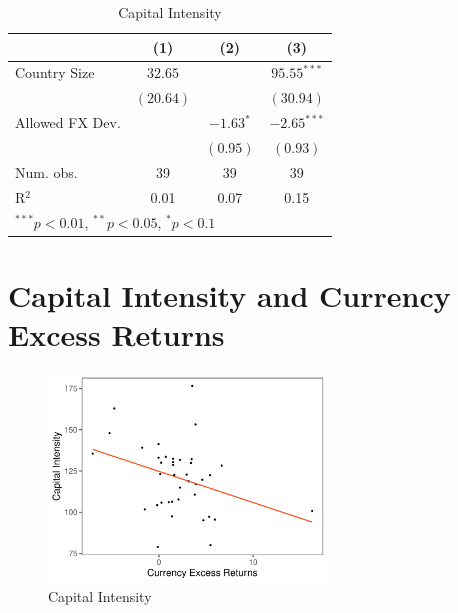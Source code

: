 \documentclass[12pt,english,round]{article}
\begin{document}
\vspace{1em}

\begin{table}[htp]
\begin{center}
\caption{Capital Intensity}
\begin{tabular}{l c c c }
\hline
 & (1) & (2) & (3) \\
\hline
Country Size            & $32.65$        &                & $95.55^{***}$  \\
                        & $(20.64)$      &                & $(30.94)$      \\
Allowed FX Dev.         &                & $-1.63^{*}$    & $-2.65^{***}$  \\
                        &                & $(0.95)$       & $(0.93)$       \\
\hline
Num. obs.               & 39             & 39             & 39             \\
R$^2$                   & 0.01           & 0.07           & 0.15           \\
\hline
\multicolumn{4}{l}{\scriptsize{$^{***}p<0.01$, $^{**}p<0.05$, $^*p<0.1$}}
\end{tabular}
\end{center}
\end{table}

\clearpage

\section{Capital Intensity and Currency Excess Returns}

\begin{figure}[htp!]
    \centering
    \caption{Capital Intensity}
    \includegraphics[width=0.66\textwidth]{Figure_RX_KY.pdf}
\end{figure}
\end{document}
